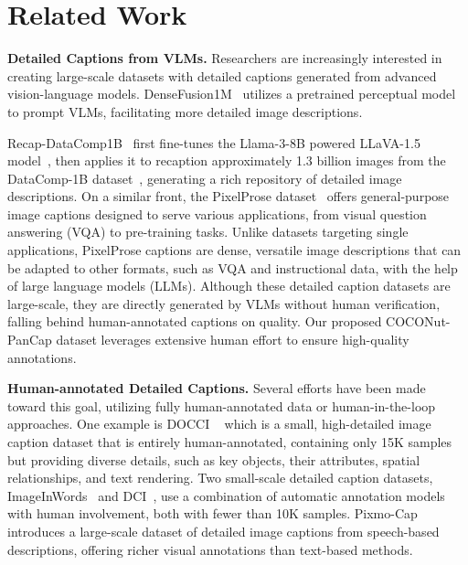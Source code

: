 


\section{Related Work}
\label{sec:related_work}


\noindent\textbf{Detailed Captions from VLMs.} Researchers are increasingly interested in creating large-scale datasets with detailed captions generated from advanced vision-language models. DenseFusion1M~\cite{li2024DenseFusion} utilizes a pretrained perceptual model to prompt VLMs, facilitating more detailed image descriptions. 

Recap-DataComp1B~\cite{li2024recaption}  first fine-tunes the Llama-3-8B powered LLaVA-1.5 model~\cite{liu2023improvedllava}, then applies it to recaption approximately 1.3 billion images from the DataComp-1B dataset~\cite{gadre2024datacomp}, generating a rich repository of detailed image descriptions. On a similar front, the PixelProse dataset~\cite{singla2024pixels} offers general-purpose image captions designed to serve various applications, from visual question answering (VQA) to pre-training tasks. Unlike datasets targeting single applications, PixelProse captions are dense, versatile image descriptions that can be adapted to other formats, such as VQA and instructional data, with the help of large language models (LLMs). Although these detailed caption datasets are large-scale, they are directly generated by VLMs without human verification, falling behind human-annotated captions on quality. Our proposed COCONut-PanCap dataset leverages extensive human effort to ensure high-quality annotations.



\noindent\textbf{Human-annotated Detailed Captions.} Several efforts have been made toward this goal, utilizing fully human-annotated data or human-in-the-loop approaches. One example is DOCCI ~\cite{Onoe2024docci} which is a small, high-detailed image caption dataset that is entirely human-annotated, containing only 15K samples but providing diverse details, such as key objects, their attributes, spatial relationships, and text rendering. Two small-scale detailed caption datasets, ImageInWords~\cite{garg2024imageinwords} and DCI~\cite{Urbanek2024dci}, use a combination of automatic annotation models with human involvement, both with fewer than 10K samples. Pixmo-Cap~\cite{deitke2024molmo} introduces a large-scale dataset of detailed image captions from speech-based descriptions, offering richer visual annotations than text-based methods. 

